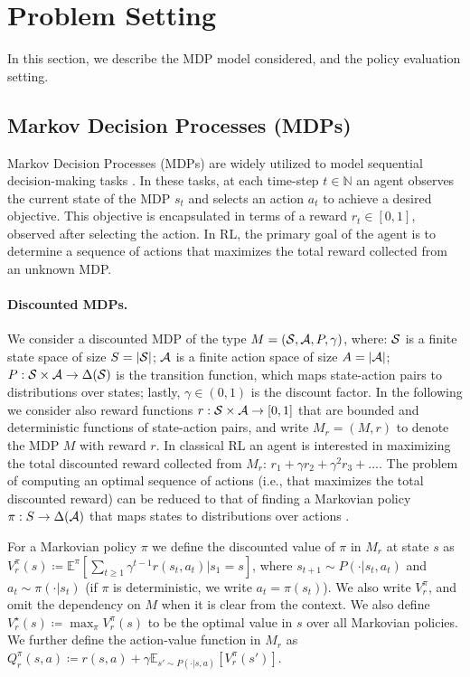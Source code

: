 \section{Problem Setting}\label{sec:problem_setting}
In this section, we describe the MDP model considered, and the policy evaluation setting.

\subsection{Markov Decision Processes (MDPs)}
Markov Decision Processes (MDPs) are widely utilized to model sequential decision-making tasks \citep{puterman2014markov}. In these tasks, at each time-step $t\in \mathbb{N}$ an agent  observes the current state of the MDP $s_t$ and selects an action $a_t$ to achieve a  desired objective. This objective is encapsulated in terms of a  reward $r_t\in [0,1]$, observed after selecting the action. In  RL, the primary goal of the agent is to determine a sequence of actions that maximizes the total  reward collected from an unknown MDP.

\paragraph{Discounted MDPs.} We consider a discounted MDP \citep{puterman2014markov} of the type $M=({\cal S},{\cal A},P,\gamma)$, where: ${\cal S}$ is a finite state space of size $S=|{\cal S}|$; ${\cal A}$ is a finite action space of size $A=|{\cal A}|$; $P:{\cal S}\times {\cal A} \to \Delta({\cal S})$ is the transition function, which maps state-action pairs to distributions over states; lastly, $\gamma\in(0,1)$ is the discount factor.
In the following we consider also reward functions $r: {\cal S}\times {\cal A} \to [0,1]$ that are bounded and deterministic functions of state-action pairs, and write $M_r=(M,r)$ to denote the MDP $M$ with reward $r$. 
In classical RL an agent is interested in maximizing the total discounted reward collected from $M_r$:  $r_1+\gamma r_2+\gamma^2 r_3+\dots$. The problem of computing an optimal sequence of actions (i.e., that maximizes the total discounted reward) can be reduced to that of finding a Markovian policy $\pi:S \to \Delta({\cal A})$ that maps states to distributions over actions \citep{puterman2014markov}.

 
 For a Markovian policy $\pi$ we  define the discounted value of $\pi$ in $M_r$ at state $s$ as  $V_r^\pi(s)\coloneqq\mathbb{E}^\pi[\sum_{t\geq1}\gamma^{t-1} r(s_t,a_t)|s_1=s]$, where $s_{t+1}\sim P(\cdot|s_t,a_t)$ and $a_t\sim \pi(\cdot|s_t)$ (if $\pi$ is deterministic, we write $a_t=\pi(s_t)$).  We also write $V_r^\pi$, and omit the dependency on $M$ when it is clear from the context. We also define $V_r^\star(s) \coloneqq \max_{\pi} V_r^\pi(s)$ to be the optimal value in $s$ over all Markovian policies.  We further define the action-value function in $M_r$ as $Q_r^\pi(s,a)\coloneqq r(s,a)+\gamma \mathbb{E}_{s'\sim P(\cdot|s,a)}[V_r^\pi(s')]$. 
 
